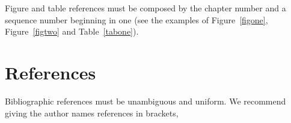 \documentclass{SBCbookchapter}
\begin{document}
Figure and table references must be composed by the chapter number and
a sequence number beginning in one (see the examples of
Figure~\ref{figone}, Figure~\ref{figtwo} and Table~\ref{tabone}).




\section{References}
Bibliographic references must be unambiguous and uniform.  We
recommend giving the author names references in brackets,


\end{document}

